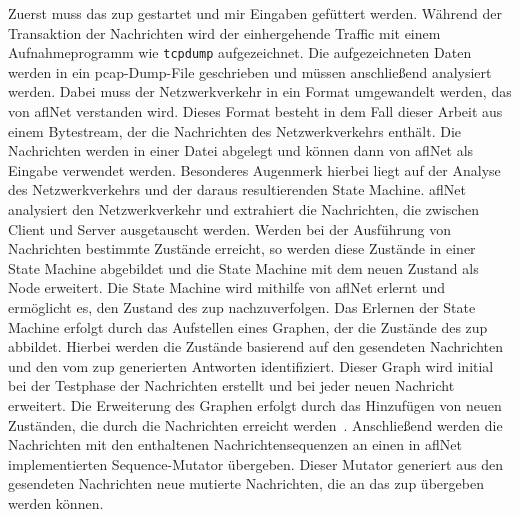 \noindent Zuerst muss das \gls{zup} gestartet und mir Eingaben gefüttert werden.
Während der Transaktion der Nachrichten wird der einhergehende Traffic mit einem Aufnahmeprogramm wie \texttt{tcpdump} aufgezeichnet.
Die aufgezeichneten Daten werden in ein \gls{pcap}-Dump-File geschrieben und müssen anschließend analysiert werden.
Dabei muss der Netzwerkverkehr in ein Format umgewandelt werden, das von \gls{afl}Net verstanden wird.
Dieses Format besteht in dem Fall dieser Arbeit aus einem Bytestream, der die Nachrichten des Netzwerkverkehrs enthält.
Die Nachrichten werden in einer Datei abgelegt und können dann von \gls{afl}Net als Eingabe verwendet werden.
Besonderes Augenmerk hierbei liegt auf der Analyse des Netzwerkverkehrs und der daraus resultierenden State Machine.
\gls{afl}Net analysiert den Netzwerkverkehr und extrahiert die Nachrichten, die zwischen Client und Server ausgetauscht werden.
Werden bei der Ausführung von Nachrichten bestimmte Zustände erreicht, so werden diese Zustände in einer State Machine
abgebildet und die State Machine mit dem neuen Zustand als Node erweitert.
Die State Machine wird mithilfe von \gls{afl}Net erlernt und ermöglicht es, den Zustand des \gls{zup} nachzuverfolgen.
Das Erlernen der State Machine erfolgt durch das Aufstellen eines Graphen, der die Zustände des \gls{zup} abbildet.
Hierbei werden die Zustände basierend auf den gesendeten Nachrichten und den vom \gls{zup} generierten Antworten identifiziert.
Dieser Graph wird initial bei der Testphase der Nachrichten erstellt und bei jeder neuen Nachricht erweitert.
Die Erweiterung des Graphen erfolgt durch das Hinzufügen von neuen Zuständen, die durch die Nachrichten erreicht werden~\cite{AFLNet}.
\newline
Anschließend werden die Nachrichten mit den enthaltenen Nachrichtensequenzen an einen in \gls{afl}Net implementierten
Sequence-Mutator übergeben.
Dieser Mutator generiert aus den gesendeten Nachrichten neue mutierte Nachrichten, die an das \gls{zup} übergeben werden
können.
